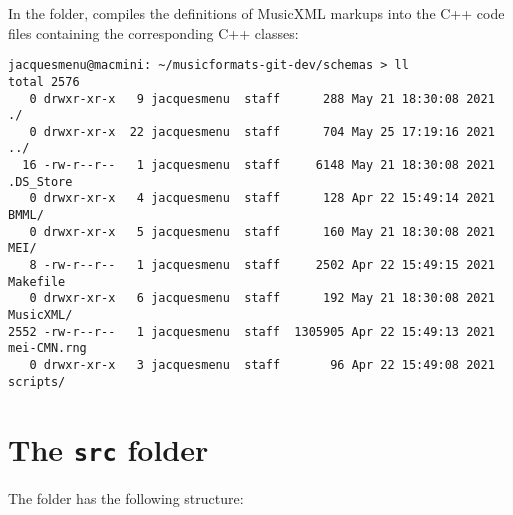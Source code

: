 In the  folder,  compiles the definitions of MusicXML markups into the C++ code files containing the corresponding C++ classes:
\begin{lstlisting}[language=Terminal]
jacquesmenu@macmini: ~/musicformats-git-dev/schemas > ll
total 2576
   0 drwxr-xr-x   9 jacquesmenu  staff      288 May 21 18:30:08 2021 ./
   0 drwxr-xr-x  22 jacquesmenu  staff      704 May 25 17:19:16 2021 ../
  16 -rw-r--r--   1 jacquesmenu  staff     6148 May 21 18:30:08 2021 .DS_Store
   0 drwxr-xr-x   4 jacquesmenu  staff      128 Apr 22 15:49:14 2021 BMML/
   0 drwxr-xr-x   5 jacquesmenu  staff      160 May 21 18:30:08 2021 MEI/
   8 -rw-r--r--   1 jacquesmenu  staff     2502 Apr 22 15:49:15 2021 Makefile
   0 drwxr-xr-x   6 jacquesmenu  staff      192 May 21 18:30:08 2021 MusicXML/
2552 -rw-r--r--   1 jacquesmenu  staff  1305905 Apr 22 15:49:13 2021 mei-CMN.rng
   0 drwxr-xr-x   3 jacquesmenu  staff       96 Apr 22 15:49:08 2021 scripts/
\end{lstlisting}


\section{The {\tt src} folder}

The  folder has the following structure:%

